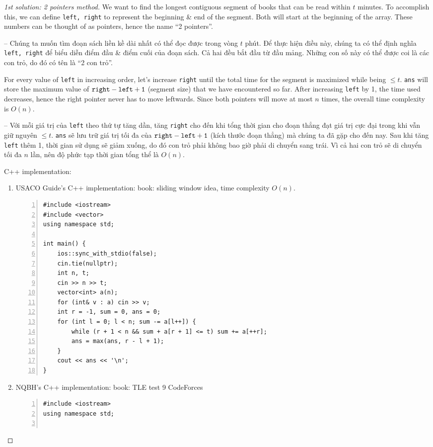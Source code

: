 \documentclass{article}
\begin{document}
\begin{proof}[1st solution: 2 pointers method]
    We want to find the longest contiguous segment of books that can be read within $t$ minutes. To accomplish this, we can define {\tt left, right} to represent the beginning \& end of the segment. Both will start at the beginning of the array. These numbers can be thought of as pointers, hence the name ``2 pointers''.

    -- Chúng ta muốn tìm đoạn sách liền kề dài nhất có thể đọc được trong vòng $t$ phút. Để thực hiện điều này, chúng ta có thể định nghĩa {\tt left, right} để biểu diễn điểm đầu \& điểm cuối của đoạn sách. Cả hai đều bắt đầu từ đầu mảng. Những con số này có thể được coi là các con trỏ, do đó có tên là ``2 con trỏ''.

    For every value of {\tt left} in increasing order, let's increase {\tt right} until the total time for the segment is maximized while being $\le t $. {\tt ans} will store the maximum value of $\tt right - left + 1$ (segment size) that we have encountered so far. After increasing {\tt left} by 1, the time used decreases, hence the right pointer never has to move leftwards. Since both pointers will move at most $n$ times, the overall time complexity is $O(n)$.

    -- Với mỗi giá trị của {\tt left} theo thứ tự tăng dần, tăng {\tt right} cho đến khi tổng thời gian cho đoạn thẳng đạt giá trị cực đại trong khi vẫn giữ nguyên $\le t $. {\tt ans} sẽ lưu trữ giá trị tối đa của $\tt right - left + 1$ (kích thước đoạn thẳng) mà chúng ta đã gặp cho đến nay. Sau khi tăng {\tt left} thêm 1, thời gian sử dụng sẽ giảm xuống, do đó con trỏ phải không bao giờ phải di chuyển sang trái. Vì cả hai con trỏ sẽ di chuyển tối đa $n$ lần, nên độ phức tạp thời gian tổng thể là $O(n)$.

    C++ implementation:
    \begin{enumerate}
        \item USACO Guide's C++ implementation: book: sliding window idea, time complexity $O(n)$.
        \begin{Verbatim}[numbers=left,xleftmargin=5mm]
#include <iostream>
#include <vector>
using namespace std;

int main() {
    ios::sync_with_stdio(false);
    cin.tie(nullptr);
    int n, t;
    cin >> n >> t;
    vector<int> a(n);
    for (int& v : a) cin >> v;
    int r = -1, sum = 0, ans = 0;
    for (int l = 0; l < n; sum -= a[l++]) {
        while (r + 1 < n && sum + a[r + 1] <= t) sum += a[++r];
        ans = max(ans, r - l + 1);
    }
    cout << ans << '\n';
}
        \end{Verbatim}
        \item NQBH's C++ implementation: book: TLE test 9 CodeForces
        \begin{Verbatim}[numbers=left,xleftmargin=5mm]
#include <iostream>
using namespace std;


\end{Verbatim}
\end{enumerate}
\end{proof}
\end{document}
